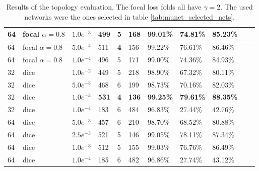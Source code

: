 \begin{table}
\begin{center}
\begin{tabular}{|l|l|l|l|l|l|l|l|l|l|l|}
\hline
64                  & focal $\alpha=0.8$ & $1.0e^{-3}$            & 499 & 5  & 168 & 99.01\%   & 74.81\% & 85.23\% \\
\hline
64                  & focal $\alpha=0.8$ & $5.0e^{-4}$            & 511 & \textbf{4}  & 156 & 99.22\%   & 76.61\% & 86.46\% \\
\hline
64                  & focal $\alpha=0.8$ & $1.0e^{-4}$            & 496 & 5  & 171 & 99.00\%   & 74.36\% & 84.93\% \\
\hline
32                  & dice               & $1.0e^{-2}$            & 449 & 5  & 218 & 98.90\%   & 67.32\% & 80.11\% \\
\hline
32                  & dice               & $5.0e^{-3}$            & 468 & 6  & 199 & 98.73\%   & 70.16\% & 82.03\% \\
\hline
32                  & dice               & $1.0e^{-3}$            & \textbf{531} & \textbf{4}  & \textbf{136} & \textbf{99.25\%}   & \textbf{79.61\%} & \textbf{88.35\%} \\
\hline
32                  & dice               & $1.0e^{-4}$            & 183 & 6  & 484 & 96.83\%   & 27.44\% & 42.76\% \\
\hline
64                  & dice               & $5.0e^{-3}$            & 457 & 6  & 210 & 98.70\%   & 68.52\% & 80.88\% \\
\hline
64                  & dice               & $2.5e^{-3}$            & 521 & 5  & 146 & 99.05\%   & 78.11\% & 87.34\% \\
\hline
64                  & dice               & $1.0e^{-3}$            & 512 & 5  & 155 & 99.03\%   & 76.76\% & 86.49\% \\
\hline
64                  & dice & $1.0e^{-4}$            & 185 & 6  & 482 & 96.86\%   & 27.74\% & 43.12\% \\
\hline

\end{tabular}
\caption{Results of the topology evaluation. The focal loss folds all have $\gamma = 2$. The used networks were the ones selected in table \ref{tab:munet_selected_nets}.}
\label{tab:topology_test_plain}
\end{center}
\end{table}

